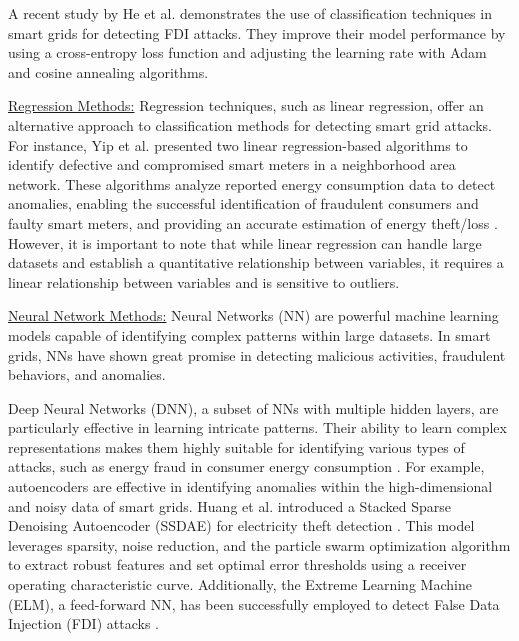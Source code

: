 \documentclass[10pt, journal]{IEEEtran}
\begin{document}
A recent study by He et al. \cite{he2024detection} demonstrates the use of classification techniques in smart grids for detecting FDI attacks. They improve their model performance by using a cross-entropy loss function and adjusting the learning rate with Adam and cosine annealing algorithms.


        
\underline{Regression Methods:}
Regression techniques, such as linear regression, offer an alternative approach to classification methods for detecting smart grid attacks. For instance, Yip et al. presented two linear regression-based algorithms to identify defective and compromised smart meters in a neighborhood area network. These algorithms analyze reported energy consumption data to detect anomalies, enabling the successful identification of fraudulent consumers and faulty smart meters, and providing an accurate estimation of energy theft/loss \cite{yip2017detection}. However, it is important to note that while linear regression can handle large datasets and establish a quantitative relationship between variables, it requires a linear relationship between variables and is sensitive to outliers.
				
\underline{Neural Network Methods:}
Neural Networks (NN) are powerful machine learning models capable of identifying complex patterns within large datasets. In smart grids, NNs have shown great promise in detecting malicious activities, fraudulent behaviors, and anomalies.

Deep Neural Networks (DNN), a subset of NNs with multiple hidden layers, are particularly effective in learning intricate patterns. Their ability to learn complex representations makes them highly suitable for identifying various types of attacks, such as energy fraud in consumer energy consumption \cite{ford2014smart}. For example, autoencoders are effective in identifying anomalies within the high-dimensional and noisy data of smart grids. Huang et al. introduced a Stacked Sparse Denoising Autoencoder (SSDAE) for electricity theft detection \cite{huang2021electricity}. This model leverages sparsity, noise reduction, and the particle swarm optimization algorithm to extract robust features and set optimal error thresholds using a receiver operating characteristic curve. Additionally, the Extreme Learning Machine (ELM), a feed-forward NN, has been successfully employed to detect False Data Injection (FDI) attacks \cite{xue2019detection,li2018intrusion,yang2017improved}.
\end{document}

